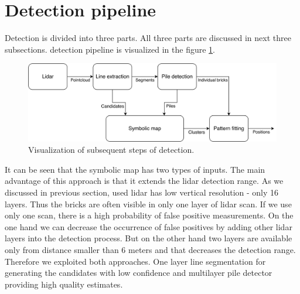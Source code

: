 \section{Detection pipeline}
Detection is divided into three parts. All three parts are discussed in next three subsections. detection pipeline is visualized in the figure \ref{fig:flowchart}. 

\hspace{5px}
\begin{figure}[H]
\centering
\includegraphics[scale=0.06]{fig/flowchart.pdf}
\caption[Program pipeline]{Visualization of subsequent steps of detection.}
\label{fig:flowchart}
\end{figure}

It can be seen that the symbolic map has two types of inputs. The main advantage of this approach is that it extends the lidar detection range. As we discussed in previous section, used lidar has low vertical resolution - only 16 layers. Thus the bricks are often visible in only one layer of lidar scan. If we use only one scan, there is a high probability of false positive measurements. On the one hand we can decrease the occurrence of false positives by adding other lidar layers into the detection process. But on the other hand two layers are available only from distance smaller than 6 meters and that decreases the detection range. Therefore we exploited both approaches. One layer line segmentation for generating the candidates with low confidence and multilayer pile detector providing high quality estimates.

